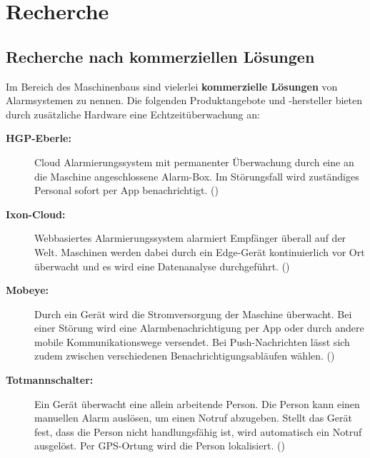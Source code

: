 \section{Recherche}

\subsection{Recherche nach kommerziellen Lösungen}
Im Bereich des Maschinenbaus sind vielerlei \textbf{kommerzielle Lösungen} von Alarmsystemen zu nennen. Die folgenden Produktangebote und -hersteller bieten durch zusätzliche Hardware eine Echtzeitüberwachung an:
\begin{description}
    \item [\textbf{HGP-Eberle:}] 
    Cloud Alarmierungssystem mit permanenter Überwachung durch eine an die Maschine angeschlossene Alarm-Box. Im Störungsfall wird zuständiges Personal sofort per App benachrichtigt. (\cite{HGP-Eberle})
   
   \item [\textbf{Ixon-Cloud:}] 
   Webbasiertes Alarmierungssystem alarmiert Empfänger überall auf der Welt. Maschinen werden dabei durch ein Edge-Gerät kontinuierlich vor Ort überwacht und es wird eine Datenanalyse durchgeführt. (\cite{Ixon-Cloud})
   
   \item [\textbf{Mobeye:}] 
   Durch ein Gerät wird die Stromversorgung der Maschine überwacht. Bei einer Störung wird eine Alarmbenachrichtigung per App oder durch andere mobile Kommunikationswege versendet. Bei Push-Nachrichten lässt sich zudem zwischen verschiedenen Benachrichtigungsabläufen wählen. (\cite{Mobeye})
   
   \item [\textbf{Totmannschalter:}] 
   Ein Gerät überwacht eine allein arbeitende Person. Die Person kann einen manuellen Alarm auslösen, um einen Notruf abzugeben. Stellt das Gerät fest, dass die Person nicht handlungsfähig ist, wird automatisch ein Notruf ausgelöst. Per GPS-Ortung wird die Person lokalisiert. (\cite{totmann})
\end{description}
 
\

